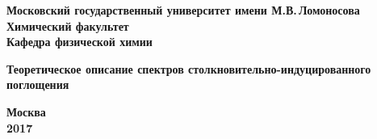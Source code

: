 \begin{titlepage}
\centering
\textbf{\large Московский государственный университет имени М.В.\,Ломоносова\\
\vspace*{0.1cm} Химический факультет\\
\vspace*{0.1cm}
\vspace*{0.5cm}
 Кафедра физической химии\\}

\vspace*{2cm}



\vspace*{2cm}
\Large \textbf{Теоретическое описание спектров столкновительно-индуцированного поглощения}
\vspace*{2cm}

\vfill
\large\textbf{Москва\\ 2017}
\end{titlepage}
